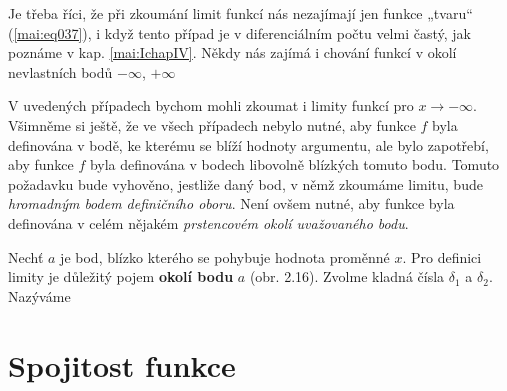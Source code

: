      

    Je třeba říci, že při zkoumání limit funkcí nás nezajímají jen funkce „tvaru“ 
    (\ref{mai:eq037}), i když tento případ je v diferenciálním počtu velmi častý, jak poznáme v 
    kap. \ref{mai:IchapIV}. Někdy nás zajímá i chování funkcí v okolí nevlastních bodů \(-\infty\), 
    \(+\infty\) 

      
    
      
    
    V uvedených případech bychom mohli zkoumat i limity funkcí pro \(x \to - \infty\).  Všimněme si 
    ještě, že ve všech případech nebylo nutné, aby funkce \(f\) byla definována v bodě, ke kterému 
    se blíží hodnoty argumentu, ale bylo zapotřebí, aby funkce \(f\) byla definována v bodech 
    libovolně blízkých tomuto bodu. Tomuto požadavku bude vyhověno, jestliže daný bod, v němž 
    zkoumáme limitu, bude \emph{hromadným bodem definičního oboru}. Není ovšem nutné, aby funkce 
    byla definována v celém nějakém \emph{prstencovém okolí uvažovaného bodu}.
    
    Nechť \(a\) je bod, blízko kterého se pohybuje hodnota proměnné \(x\). Pro definici limity je 
    důležitý pojem \textbf{okolí bodu} \(a\) (obr. 2.16). Zvolme kladná čísla \(\delta_1\) a 
    \(\delta_2\). Nazýváme
    
    
      
  \section{Spojitost funkce}
  
\printbibliography[title={Seznam literatury}, heading=subbibliography]
